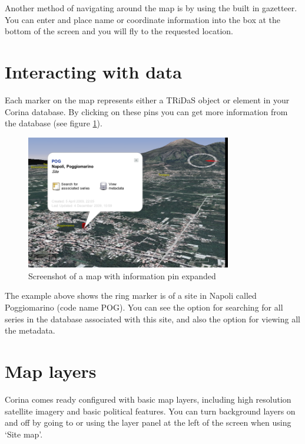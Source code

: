 
Another method of navigating around the map is by using the built in gazetteer. You can enter and place name or coordinate information into the box at the bottom of the screen and you will fly to the requested location. 


\section{Interacting with data}

Each marker on the map represents either a TRiDaS object or element in your Corina database. By clicking on these pins you can get more information from the database (see figure \ref{fig:mappin}).

\begin{figure}[hbtp]
  \centering
  \includegraphics[width=0.8\textwidth]{Images/mappinexample.png}
  \caption{Screenshot of a map with information pin expanded}
  \label{fig:mappin}
\end{figure}

The example above shows the ring marker is of a site in Napoli called Poggiomarino (code name POG). You can see the option for searching for all series in the database associated with this site, and also the option for viewing all the metadata. 

\section{Map layers}
\label{txt:userAddWMS}

Corina comes ready configured with basic map layers, including high resolution satellite imagery and basic political features. You can turn background layers on and off by going to  or using the layer panel at the left of the screen when using `Site map'.

